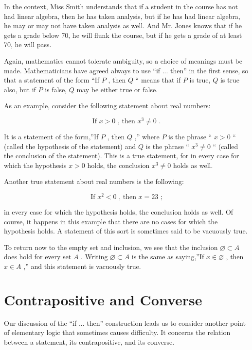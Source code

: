 In the context, Miss Smith understands that if a student in the course has not had linear algebra, then he has taken analysis, but if he has had linear algebra, he may or may not have taken analysis as well. And Mr. Jones knows that if he gets a grade below 70, he will flunk the course, but if he gets a grade of at least 70, he will pass.

Again, mathematics cannot tolerate ambiguity, so a choice of meanings must be made. Mathematicians have agreed always to use ``if ... then'' in the first sense, so that a statement of the form ``If \(P\) , then \(Q\) `` means that if \(P\) is true, \(Q\) is true also, but if \(P\) is false, \(Q\) may be either true or false.

As an example, consider the following statement about real numbers:

\[
\text{ If }x > 0\text{ , then }{x}^{3} \neq  0\text{ . }
\]

It is a statement of the form,''If \(P\) , then \(Q\) ,'' where \(P\) is the phrase `` \(x > 0\) `` (called the hypothesis of the statement) and \(Q\) is the phrase `` \({x}^{3} \neq  0\) `` (called the conclusion of the statement). This is a true statement, for in every case for which the hypothesis \(x > 0\) holds, the conclusion \({x}^{3} \neq  0\) holds as well.

Another true statement about real numbers is the following:

\[
\text{ If }{x}^{2} < 0\text{ , then }x = {23}\text{ ; }
\]

in every case for which the hypothesis holds, the conclusion holds as well. Of course, it happens in this example that there are no cases for which the hypothesis holds. A statement of this sort is sometimes said to be vacuously true.

To return now to the empty set and inclusion, we see that the inclusion \(\varnothing  \subset  A\) does hold for every set \(A\) . Writing \(\varnothing  \subset  A\) is the same as saying,''If \(x \in  \varnothing\) , then \(x \in  A\) ,'' and this statement is vacuously true.

\section*{Contrapositive and Converse}

Our discussion of the ``if ... then'' construction leads us to consider another point of elementary logic that sometimes causes difficulty. It concerns the relation between a statement, its contrapositive, and its converse.

